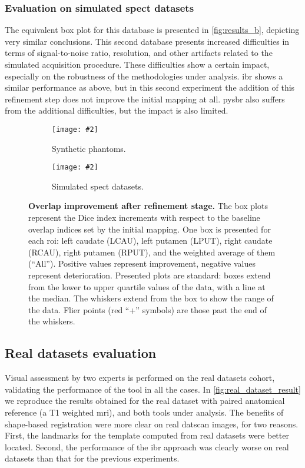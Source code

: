 \documentclass{frontiers}
\newcommand{\insertgraphic}[2]{\texttt{[image: \#2]}}
\newcommand{\insertgraphic}[2]{\texttt{[image: \#2]}}
\begin{document}
\subsubsection{Evaluation on simulated \gls*{spect} datasets}
\label{sec:results_simulated}
The equivalent box plot for this database is presented in \autoref{fig:results_b},
  depicting very similar conclusions.
This second database presents increased difficulties in terms of signal-to-noise
  ratio, resolution, and other artifacts related to the simulated acquisition
  procedure.
These difficulties show a certain impact, especially on the robustness of the
  methodologies under analysis.
\Gls*{ibr} shows a similar performance as above, but in this second experiment the addition
  of this refinement step does not improve the initial mapping at all.
\Gls*{pysbr} also suffers from the additional difficulties, but the impact is
  also limited.

\begin{figure*}[ht]
\centering 
\begin{subfigure}[b]{0.61\linewidth}
\insertgraphic{width=1.0\linewidth}{figures/05-results-phantoms}
\caption{\label{fig:results_a}
Synthetic phantoms.
}
\end{subfigure}
\hfill
\begin{subfigure}[b]{0.33\linewidth}
\insertgraphic{width=1.0\linewidth}{figures/05-results-simulated}
\caption{\label{fig:results_b}
Simulated \gls*{spect} datasets.
}
\end{subfigure}

\caption{\label{fig:results}
\textbf{Overlap improvement after refinement stage.}
The box plots represent the Dice index increments with respect to the baseline overlap
  indices set by the initial mapping. One box is presented for each \gls*{roi}:
  left caudate (LCAU), left putamen (LPUT), right caudate (RCAU), right putamen (RPUT),
  and the weighted average of them (``All''). Positive values represent improvement,
  negative values represent deterioration.
Presented plots are standard: boxes extend from the lower to upper quartile values
  of the data, with a line at the median. The whiskers extend from the box to show
  the range of the data. Flier points (red ``+'' symbols) are those past the end of
  the whiskers.
}
\end{figure*}

\subsection{Real datasets evaluation}
\label{sec:results_real}
Visual assessment by two experts is performed on the real datasets cohort,
  validating the performance of the tool in all the cases.
In \autoref{fig:real_dataset_result} we reproduce the results obtained
  for the real dataset with paired anatomical reference (a T1 weighted \gls*{mri}),
  and both tools under analysis.
The benefits of shape-based registration were more clear on real \gls*{datscan}
  images, for two reasons.
First, the landmarks for the template computed from real datasets were 
  better located.
Second, the performance of the \gls*{ibr} approach was clearly worse on
  real datasets than that for the previous experiments.
\end{document}
